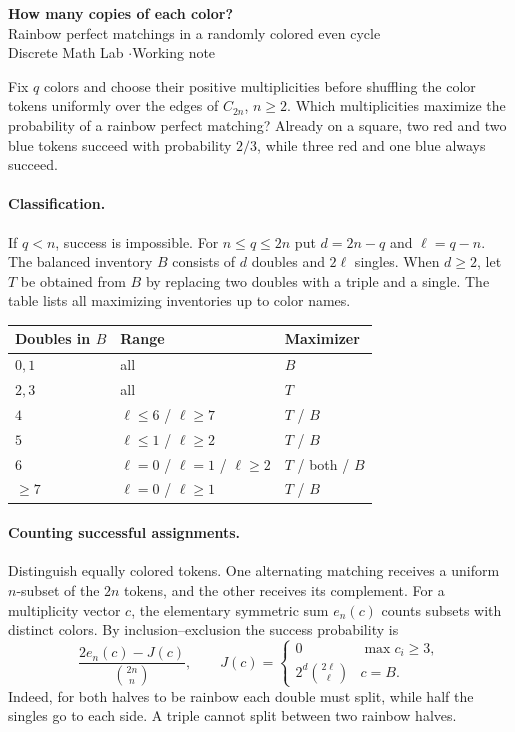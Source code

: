 \documentclass[11pt]{article}
\newcommand{\bin}[2]{\binom{#1}{#2}}
\begin{document}
\begin{center}
{\Large\bfseries How many copies of each color?}\\[4pt]
{\large Rainbow perfect matchings in a randomly colored even cycle}\\[5pt]
Discrete Math Lab \quad$\cdot$\quad Working note
\end{center}

Fix $q$ colors and choose their positive multiplicities before shuffling the
color tokens uniformly over the edges of $C_{2n}$, $n\ge2$. Which
multiplicities maximize the probability of a rainbow perfect matching?
Already on a square, two red and two blue tokens succeed with probability
$2/3$, while three red and one blue always succeed.

\paragraph{Classification.}
If $q<n$, success is impossible. For $n\le q\le 2n$ put
$d=2n-q$ and $\ell=q-n$. The balanced inventory $B$ consists of
$d$ doubles and $2\ell$ singles. When $d\ge2$, let $T$ be obtained from
$B$ by replacing two doubles with a triple and a single. The table lists
all maximizing inventories up to color names.
\begin{center}
\begin{tabular}{lll}
\toprule
Doubles in $B$ & Range & Maximizer\\
\midrule
$0,1$ & all & $B$\\
$2,3$ & all & $T$\\
$4$ & $\ell\le6$ / $\ell\ge7$ & $T$ / $B$\\
$5$ & $\ell\le1$ / $\ell\ge2$ & $T$ / $B$\\
$6$ & $\ell=0$ / $\ell=1$ / $\ell\ge2$ & $T$ / both / $B$\\
$\ge7$ & $\ell=0$ / $\ell\ge1$ & $T$ / $B$\\
\bottomrule
\end{tabular}
\end{center}

\paragraph{Counting successful assignments.}
Distinguish equally colored tokens. One alternating matching receives a
uniform $n$-subset of the $2n$ tokens, and the other receives its complement.
For a multiplicity vector $c$, the elementary symmetric sum $e_n(c)$ counts
subsets with distinct colors. By inclusion--exclusion the success probability is
\[
\frac{2e_n(c)-J(c)}{\bin{2n}{n}},
\qquad
J(c)=
\begin{cases}
0 & \max c_i\ge3,\\
2^d\bin{2\ell}{\ell} & c=B .
\end{cases}
\]
Indeed, for both halves to be rainbow each double must split, while half
the singles go to each side. A triple cannot split between two rainbow halves.
\end{document}
